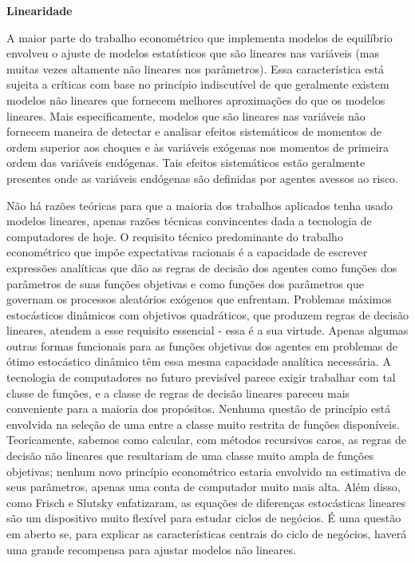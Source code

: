 \documentclass[12pt]{article}
\begin{document}
\textbf{Linearidade}

A maior parte do trabalho econométrico que implementa modelos de equilíbrio envolveu o ajuste de modelos estatísticos que são lineares nas variáveis (mas muitas vezes altamente não lineares nos parâmetros). Essa característica está sujeita a críticas com base no princípio indiscutível de que geralmente existem modelos não lineares que fornecem melhores aproximações do que os modelos lineares. Mais especificamente, modelos que são lineares nas variáveis não fornecem maneira de detectar e analisar efeitos sistemáticos de momentos de ordem superior aos choques e às variáveis exógenas nos momentos de primeira ordem das variáveis endógenas. Tais efeitos sistemáticos estão geralmente presentes onde as variáveis endógenas são definidas por agentes avessos ao risco.

Não há razões teóricas para que a maioria dos trabalhos aplicados tenha usado modelos lineares, apenas razões técnicas convincentes dada a tecnologia de computadores de hoje. O requisito técnico predominante do trabalho econométrico que impõe expectativas racionais é a capacidade de escrever expressões analíticas que dão as regras de decisão dos agentes como funções dos parâmetros de suas funções objetivas e como funções dos parâmetros que governam os processos aleatórios exógenos que enfrentam. Problemas máximos estocásticos dinâmicos com objetivos quadráticos, que produzem regras de decisão lineares, atendem a esse requisito essencial - essa é a sua virtude. Apenas algumas outras formas funcionais para as funções objetivas dos agentes em problemas de ótimo estocástico dinâmico têm essa mesma capacidade analítica necessária. A tecnologia de computadores no futuro previsível parece exigir trabalhar com tal classe de funções, e a classe de regras de decisão lineares pareceu mais conveniente para a maioria dos propósitos. Nenhuma questão de princípio está envolvida na seleção de uma entre a classe muito restrita de funções disponíveis. Teoricamente, sabemos como calcular, com métodos recursivos caros, as regras de decisão não lineares que resultariam de uma classe muito ampla de funções objetivas; nenhum novo princípio econométrico estaria envolvido na estimativa de seus parâmetros, apenas uma conta de computador muito mais alta. Além disso, como Frisch e Slutsky enfatizaram, as equações de diferenças estocásticas lineares são um dispositivo muito flexível para estudar ciclos de negócios. É uma questão em aberto se, para explicar as características centrais do ciclo de negócios, haverá uma grande recompensa para ajustar modelos não lineares.
\end{document}
